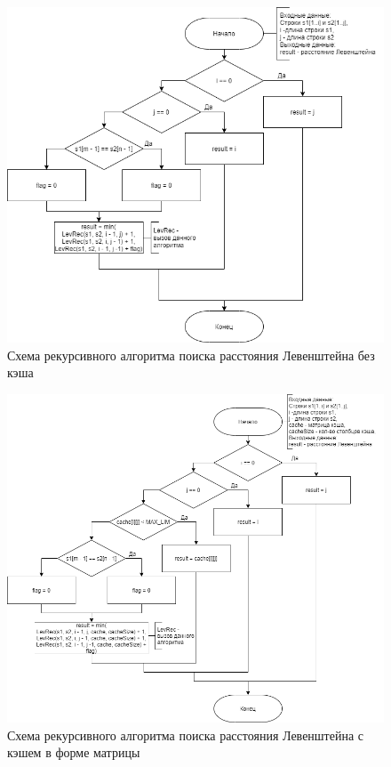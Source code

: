 \newpage 
\begin{figure}[H]
	\begin{center}
		\includegraphics[scale=0.6]{assets/LevRecWithoutCache.png}
	\end{center}
	\caption{Схема рекурсивного алгоритма поиска расстояния Левенштейна без кэша}
\end{figure}

\newpage 
\begin{figure}[H]
	\begin{center}
		\includegraphics[scale=0.6]{assets/LevRecWithCache.png}
	\end{center}
	\caption{Схема рекурсивного алгоритма поиска расстояния Левенштейна с кэшем в форме матрицы}
\end{figure}

